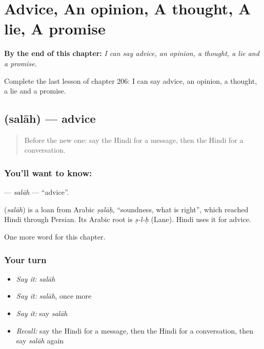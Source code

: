 
\chapter{Advice, An opinion, A thought, A lie, A promise}
\label{ch:hi-advice-an-opinion-a-thought-a-lie-a-promise}

\begin{chapteropening}
\textbf{By the end of this chapter:} \emph{I can say advice, an opinion, a thought, a lie and a promise.}

Complete the last lesson of chapter 206: I can say advice, an opinion, a thought, a lie and a promise.
\end{chapteropening}

\section[\texorpdfstring{\hi{सलाह} (salāh)}{सलाह (salāh)}]{ (salāh) — advice}

\label{lesson:HI-C206-salah}



\begin{quote}
Before the new one: say the Hindi for a message, then the Hindi for a conversation.
\end{quote}

\subsection*{You'll want to know: }
\textbf{} — \emph{salāh} — \textquotedblleft{}advice\textquotedblright{}.

\begin{cousinweb}
\textbf{} (\emph{salāh}) is a loan from Arabic \emph{ṣalāḥ}, \textquotedblleft{}soundness, what is right\textquotedblright{}, which reached Hindi through Persian. Its Arabic root is \emph{ṣ-l-ḥ} (Lane). Hindi uses it for advice.
\end{cousinweb}

\begin{grammarlens}[title={What you've built}]
One more word for this chapter.
\end{grammarlens}

\subsection*{Your turn}
\begin{itemize}
\raggedright
  \item \emph{Say it:} \emph{salāh}
  \item \emph{Say it:} \emph{salāh}, once more
  \item \emph{Say it:} say \emph{salāh}
  \item \emph{Recall:} say the Hindi for a message, then the Hindi for a conversation, then say \emph{salāh} again
\end{itemize}

